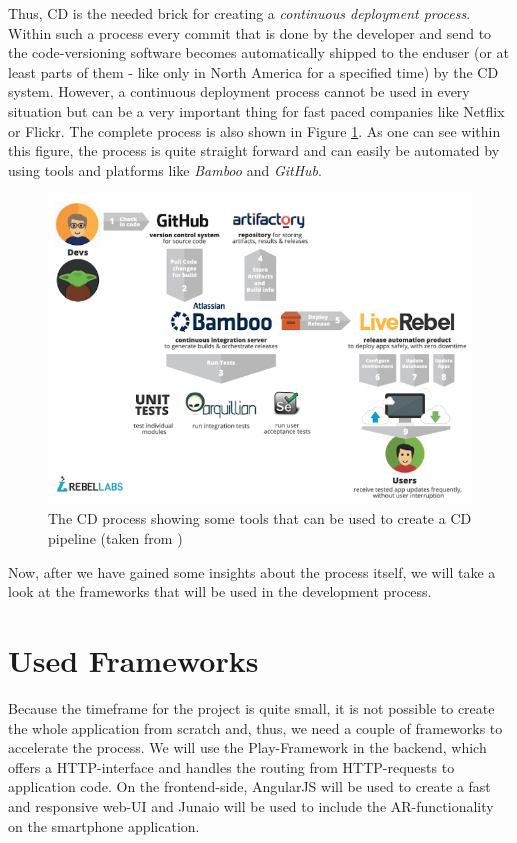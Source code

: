 Thus, \ac{CD} is the needed brick for creating a \emph{continuous deployment process}. Within such a process every commit that is done by the developer and send to the code-versioning software becomes automatically shipped to the enduser (or at least parts of them - like only in North America for a specified time) by the \ac{CD} system. However, a continuous deployment process cannot be used in every situation but can be a very important thing for fast paced companies like Netflix or Flickr. The complete process is also shown in Figure \ref{hip:cd}. As one can see within this figure, the process is quite straight forward and can easily be automated by using tools and platforms like \emph{Bamboo} and \emph{GitHub}.

\begin{figure}[th]
\centerline{\includegraphics[width=1\textwidth]{gfx/continuous-delivery}}
\caption{The \ac{CD} process showing some tools that can be used to create a \ac{CD} pipeline (taken from \cite{Wattson:2013aa})}
\label{hip:cd}
\end{figure}

Now, after we have gained some insights about the process itself, we will take a look at the frameworks that will be used in the development process.

\section{Used Frameworks}
Because the timeframe for the project is quite small, it is not possible to create the whole application from scratch and, thus, we need a couple of frameworks to accelerate the process. We will use the Play-Framework in the backend, which offers a \ac{HTTP}-interface and handles the routing from \ac{HTTP}-requests to application code. On the frontend-side, AngularJS will be used to create a fast and responsive web-\ac{UI} and Junaio will be used to include the \ac{AR}-functionality on the smartphone application.

